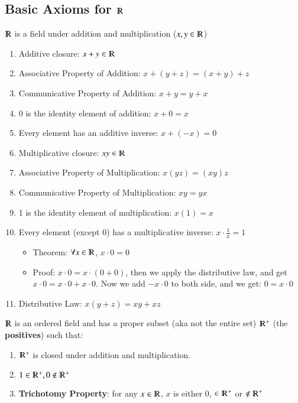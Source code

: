 \documentclass [12 pt, twoside] {book}
\newcommand\+{\text{ }}
\begin{document}
\subsection{Basic Axioms for $\varmathbb{R}$}
$\varmathbb{R}$ is a field under addition and multiplication ($x, y \in \varmathbb{R}$)
\begin{enumerate}
    \item Additive closure: $x + y \in \varmathbb{R}$
    \item Associative Property of Addition: $x + (y + z) = (x + y) + z$
    \item Communicative Property of Addition: $x + y = y + x$
    \item 0 is the identity element of addition: $x + 0 = x$
    \item Every element has an additive inverse: $x + (-x) = 0$
    \item Multiplicative closure: $xy \in \varmathbb{R}$
    \item Associative Property of Multiplication: $x(yz) = (xy)z$
    \item Communicative Property of Multiplication: $xy = yx$
    \item 1 is the identity element of multiplication: $x(1) = x$
    \item Every element (except 0) has a multiplicative inverse: $x \cdot \frac{1}{x} = 1$
        \begin{itemize}
            \item Theorem: $\forall x \in \varmathbb{R}$, $x \cdot 0 = 0$
            \item Proof: $x \cdot 0 = x \cdot (0 + 0)$, then we apply the distributive law,
                and get $x \cdot 0 = x \cdot 0 + x \cdot 0$. Now we add $-x
                \cdot 0$ to both side,
                and we get: $0 = x \cdot0$
        \end{itemize}
    \item Distributive Law: $x(y + z) = xy + xz$
\end{enumerate}

$\varmathbb{R}$ is an ordered field and has a proper subset (aka not the entire
set) $\varmathbb{R}^+$ (the \textbf{positives}) such that:
\begin{enumerate}
    \item $\varmathbb{R}^+$ is closed under addition and multiplication.
    \item $1 \in \varmathbb{R}^+, 0 \notin \varmathbb{R}^+$
    \item \textbf{Trichotomy Property}: for any $x \in \varmathbb{R}$, $x$ is
        either $0$, $\in \varmathbb{R}^+$ or $\notin \varmathbb{R}^+$
\end{enumerate}
\end{document}
